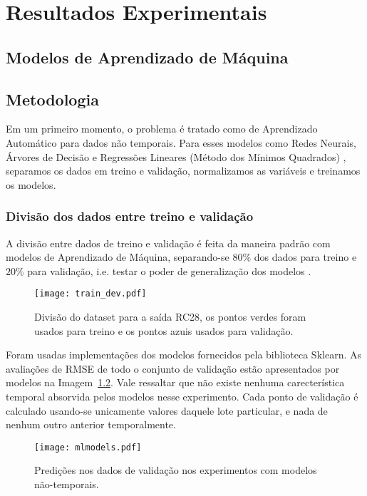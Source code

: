 \chapter{ Resultados Experimentais }
\label{cap:resultados}



\section{Modelos de Aprendizado de Máquina}



\section{Metodologia}

Em um primeiro momento, o problema é tratado como de Aprendizado Automático para
dados não temporais. Para esses modelos como Redes Neurais, Árvores de Decisão e Regressões
Lineares (Método dos Mínimos Quadrados) \citep{mlbook}, separamos os dados em treino e validação, normalizamos as variáveis e treinamos os modelos. 

\subsection{Divisão dos dados entre treino e validação}


A divisão entre dados de treino e validação é feita da maneira padrão com
modelos de Aprendizado de Máquina, separando-se $80\%$ dos dados para treino e
$20\%$ para validação, i.e. testar o poder de generalização dos modelos \cite{mlbook}.

\begin{figure}[H]
  \centering
  \texttt{[image: train\_dev.pdf]}
  \caption{Divisão do dataset para a saída RC28, os pontos verdes foram usados para
    treino e os pontos azuis usados para validação.}
  \label{fig:divrc28}
\end{figure}

Foram usadas implementações dos modelos fornecidos pela biblioteca Sklearn.
As avaliações de RMSE de todo o conjunto de validação estão apresentados por
modelos na Imagem~\ref{fig:mlmodels}. Vale ressaltar que não existe nenhuma
carecterística temporal absorvida pelos modelos nesse experimento. Cada ponto de
validação é calculado usando-se unicamente valores daquele lote particular, e
nada de nenhum outro anterior temporalmente.

\begin{figure}[H]
  \centering
\texttt{[image: mlmodels.pdf]}
\caption{Predições nos dados de validação nos experimentos com modelos não-temporais. }
\label{fig:mlmodels}
\end{figure}

